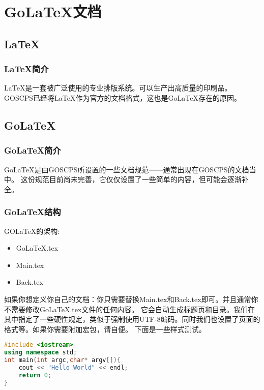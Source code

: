 \chapter{Go\LaTeX{}文档}
\section{\LaTeX{}}
\subsection{\LaTeX{}简介}

\LaTeX{}是一套被广泛使用的专业排版系统。可以生产出高质量的印刷品。
GOSCPS已经将\LaTeX{}作为官方的文档格式，这也是Go\LaTeX{}存在的原因。

\section{Go\LaTeX{}}
\subsection{Go\LaTeX{}简介}
Go\LaTeX{}是由GOSCPS所设置的一些文档规范——通常出现在G\-OS\-CP\-S的文档当中。
这份规范目前尚未完善，它仅仅设置了一些简单的内容，但可能会逐渐补全。

\subsection{Go\LaTeX{}结构}
GO\LaTeX{}的架构:

\begin{itemize}
    \item Go\LaTeX{}.tex
    \item Main.tex
    \item Back.tex
\end{itemize}

如果你想定义你自己的文档：你只需要替换Main.tex和Back.tex即可。并且通常你不需要修改Go\LaTeX{}.tex文件的任何内容。
它会自动生成标题页和目录。我们在其中指定了一些硬性规定，类似于强制使用UTF-8编码。同时我们也设置了页面的格式等。如果你需要附加宏包，请自便。
\newline{}
下面是一些样式测试。

\begin{lstlisting}[language=C++]
#include <iostream>
using namespace std;
int main(int argc,char* argv[]){
	cout << "Hello World" << endl;
	return 0;
}
\end{lstlisting}
